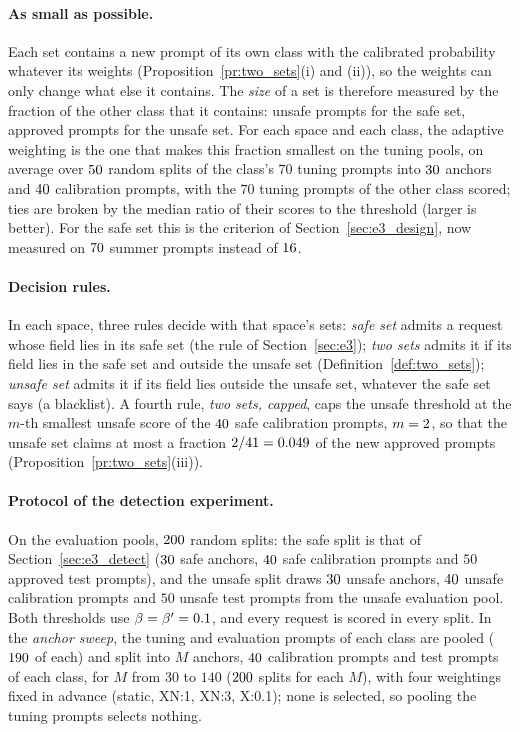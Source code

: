 \documentclass{article}
\theoremstyle{plain}
\theoremstyle{remark}
\begin{document}
\paragraph{As small as possible.}
Each set contains a new prompt of its own class with the calibrated probability whatever its weights (Proposition~\ref{pr:two_sets}(i)
and (ii)), so the weights can only change what else it contains. The \emph{size} of a set is therefore measured by the fraction of the
other class that it contains: unsafe prompts for the safe set, approved prompts for the unsafe set. For each space and each class, the
adaptive weighting is the one that makes this fraction smallest on the tuning pools, on average over $50$ random splits of the
class's $70$ tuning prompts into $30$ anchors and $40$ calibration prompts, with the $70$ tuning prompts of the other class
scored; ties are broken by the median ratio of their scores to the threshold (larger is better). For the safe set this is the
criterion of Section~\ref{sec:e3_design}, now measured on $70$ summer prompts instead of $16$.

\paragraph{Decision rules.}
In each space, three rules decide with that space's sets: \emph{safe set} admits a request whose field lies in its safe set (the rule of
Section~\ref{sec:e3}); \emph{two sets} admits it if its field lies in the safe set and outside the unsafe set
(Definition~\ref{def:two_sets}); \emph{unsafe set} admits it if its field lies outside the unsafe set, whatever the safe set says (a
blacklist). A fourth rule, \emph{two sets, capped}, caps the unsafe threshold at the $m$-th smallest unsafe score of the $40$
safe calibration prompts, $m=2$, so that the unsafe set claims at most a fraction $2/41=0.049$ of the new approved prompts
(Proposition~\ref{pr:two_sets}(iii)).

\paragraph{Protocol of the detection experiment.}
On the evaluation pools, $200$ random splits: the safe split is that of Section~\ref{sec:e3_detect} ($30$ safe anchors, $40$
safe calibration prompts and $50$ approved test prompts), and the unsafe split draws $30$ unsafe anchors, $40$ unsafe calibration
prompts and $50$ unsafe test prompts from the unsafe evaluation pool. Both thresholds use $\beta=\beta'=0.1$, and every request is
scored in every split. In the \emph{anchor sweep}, the tuning and evaluation prompts of each class are pooled ($190$ of each) and
split into $M$ anchors, $40$ calibration prompts and test prompts of each class, for $M$ from $30$ to $140$ ($200$ splits for
each $M$), with four weightings fixed in advance (static, XN:1, XN:3, X:0.1); none is selected, so pooling the tuning prompts selects
nothing.
\end{document}
